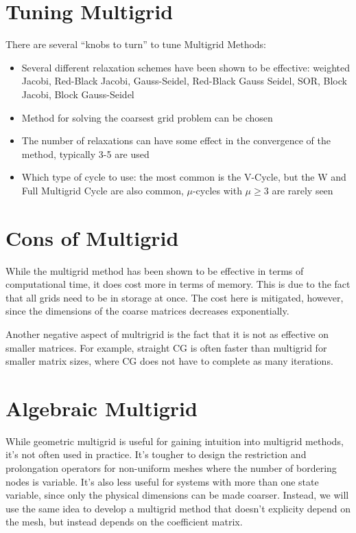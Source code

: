 \documentclass[11pt]{article}
\begin{document}
    \hypertarget{tuning-multigrid}{%
\section{Tuning Multigrid}\label{tuning-multigrid}}

There are several ``knobs to turn'' to tune Multigrid Methods:
\begin{itemize}
\item Several different relaxation schemes have been shown to be effective: weighted
Jacobi, Red-Black Jacobi, Gauss-Seidel, Red-Black Gauss Seidel, SOR,
Block Jacobi, Block Gauss-Seidel 
\item Method for solving the coarsest grid problem can be chosen 
\item The number of relaxations can have some effect in the convergence of the
  method, typically 3-5 are used 
\item Which type of cycle to use: the most common is the V-Cycle, but the W and Full
Multigrid Cycle are also common, \(\mu\)-cycles with \(\mu \geq 3\) are
rarely seen
\end{itemize}

    \hypertarget{cons-of-multigrid}{%
\section{Cons of Multigrid}\label{cons-of-multigrid}}

While the multigrid method has been shown to be effective in terms of
computational time, it does cost more in terms of memory. This is due to
the fact that all grids need to be in storage at once. The cost here is
mitigated, however, since the dimensions of the coarse matrices decreases
exponentially.

Another negative aspect of multrigrid is the fact that it is not as
effective on smaller matrices. For example, straight CG is often faster
than multigrid for smaller matrix sizes, where CG does not have to
complete as many iterations.

    \hypertarget{algebraic-multigrid}{%
\section{Algebraic Multigrid}\label{algebraic-multigrid}}

While geometric multigrid is useful for gaining intuition into multigrid
methods, it's not often used in practice. It's tougher to design the
restriction and prolongation operators for non-uniform meshes where the
number of bordering nodes is variable. It's also less useful for systems
with more than one state variable, since only the physical dimensions
can be made coarser. Instead, we will use the same idea to develop a
multigrid method that doesn't explicity depend on the mesh, but instead
depends on the coefficient matrix.
\end{document}
